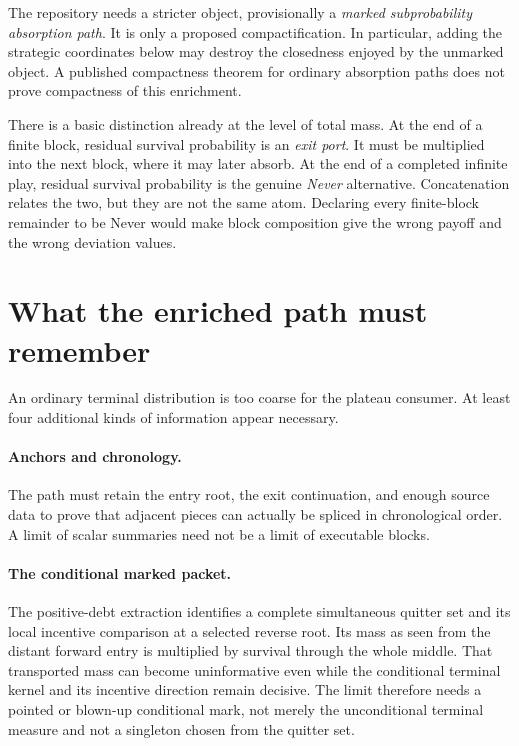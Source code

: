 \documentclass[11pt]{article}
\begin{document}
The repository needs a stricter object, provisionally a \emph{marked
subprobability absorption path}.  It is only a proposed compactification.  In
particular, adding the strategic coordinates below may destroy the closedness
enjoyed by the unmarked object.  A published compactness theorem for ordinary
absorption paths does not prove compactness of this enrichment.

There is a basic distinction already at the level of total mass.  At the end
of a finite block, residual survival probability is an \emph{exit port}.  It
must be multiplied into the next block, where it may later absorb.  At the end
of a completed infinite play, residual survival probability is the genuine
\emph{Never} alternative.  Concatenation relates the two, but they are not the
same atom.  Declaring every finite-block remainder to be Never would make
block composition give the wrong payoff and the wrong deviation values.

\section{What the enriched path must remember}

An ordinary terminal distribution is too coarse for the plateau consumer.
At least four additional kinds of information appear necessary.

\paragraph{Anchors and chronology.}
The path must retain the entry root, the exit continuation, and enough source
data to prove that adjacent pieces can actually be spliced in chronological
order.  A limit of scalar summaries need not be a limit of executable blocks.

\paragraph{The conditional marked packet.}
The positive-debt extraction identifies a complete simultaneous quitter set
and its local incentive comparison at a selected reverse root.  Its mass as
seen from the distant forward entry is multiplied by survival through the
whole middle.  That transported mass can become uninformative even while the
conditional terminal kernel and its incentive direction remain decisive.
The limit therefore needs a pointed or blown-up conditional mark, not merely
the unconditional terminal measure and not a singleton chosen from the
quitter set.
\end{document}
